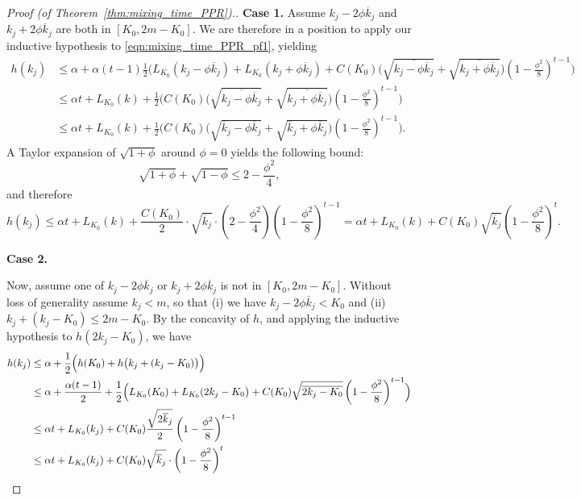 \documentclass[11pt,twoside]{article}
\theoremstyle{definition}
\newcommand{\1}{\mathbbm{1}}
\begin{document}
\begin{proof}[Proof (of Theorem~\ref{thm:mixing_time_PPR}).]
	\textbf{Case 1.}
	Assume $k_j - 2 \phi \overline{k}_j$ and $k_j + 2 \phi \overline{k}_j$ are both in $[K_0,2m  - K_0]$. We are therefore in a position to apply our inductive hypothesis to \eqref{eqn:mixing_time_PPR_pf1}, yielding
	\begin{align*}
	h(k_j) & \leq \alpha + \alpha(t-1) \frac{1}{2}\biggl(L_{K_0}(k_j - \phi \overline{k}_j) + L_{K_0}(k_j + \phi \overline{k}_j) + C(K_0)\bigl(\sqrt{\overline{k_j - \phi \overline{k}_j}} + \sqrt{\overline{k_j + \phi \overline{k}_j}}\bigr)\left(1 - \frac{\phi^2}{8}\right)^{t-1} \biggr) \\
	& \leq \alpha t + L_{K_0}(k) + \frac{1}{2}\biggl(C(K_0)\bigl(\sqrt{\overline{k_j - \phi \overline{k}_j}} + \sqrt{\overline{k_j + \phi \overline{k}_j}}\bigr)\left(1 - \frac{\phi^2}{8}\right)^{t-1} \biggr) \\
	& \leq \alpha t + L_{K_0}(k) + \frac{1}{2}\biggl(C(K_0)\bigl(\sqrt{\overline{k}_j - \phi \overline{k}_j} + \sqrt{\overline{k}_j + \phi \overline{k}_j}\bigr)\left(1 - \frac{\phi^2}{8}\right)^{t-1} \biggr).
	\end{align*}
	A Taylor expansion of $\sqrt{1 + \phi}$ around $\phi = 0$ yields the following bound:
	\begin{equation*}
	\sqrt{1 + \phi} + \sqrt{1 - \phi} \leq 2 - \frac{\phi^2}{4},
	\end{equation*}
	and therefore
	\begin{equation*}
	h(k_j) \leq  \alpha t + L_{K_0}(k) + \frac{C(K_0)}{2}\cdot \sqrt{\overline{k}_j}\cdot\left(2 - \frac{\phi^2}{4}\right)\left(1 - \frac{\phi^2}{8}\right)^{t-1} = \alpha t + L_{K_0}(k) + C(K_0)\sqrt{\overline{k}_j}\left(1 - \frac{\phi^2}{8}\right)^{t}.
	\end{equation*}
	
	\textbf{Case 2.}
	
	Now, assume one of $k_j - 2 \phi \overline{k}_j$ or $k_j + 2 \phi \overline{k}_j$ is not in $[K_0,2m  - K_0]$. Without loss of generality assume $k_j < m$, so that (i) we have $k_j - 2 \phi \overline{k}_j < K_0$ and (ii) $k_j + (k_j - K_0) \leq 2m - K_0$. By the concavity of $h$, and applying the inductive hypothesis to $h(2k_j - K_0)$, we have
	\begin{align*}
	h(k_j) & \leq \alpha + \frac{1}{2}\Bigl(h(K_0) + h\bigl(k_j + (k_j - K_0)\bigr)\Bigr) \\
	& \leq\alpha + \frac{\alpha(t - 1)}{2} + \frac{1}{2}\Bigl(L_{K_0}(K_0) + L_{K_0}(2k_j - K_0\bigr) + C(K_0)\sqrt{\overline{2k_j - K_0}}\left(1 - \frac{\phi^2}{8}\right)^{t - 1}\Bigr) \\
	& \leq \alpha t + L_{K_0}(k_j) + C(K_0) \frac{\sqrt{2\overline{k}_j}}{2} \left(1 - \frac{\phi^2}{8}\right)^{t - 1} \\
	& \leq \alpha t + L_{K_0}(k_j) + C(K_0) \sqrt{\overline{k}_j} \cdot \left(1 - \frac{\phi^2}{8}\right)^{t}
	\end{align*}
\end{proof}
\end{document}
